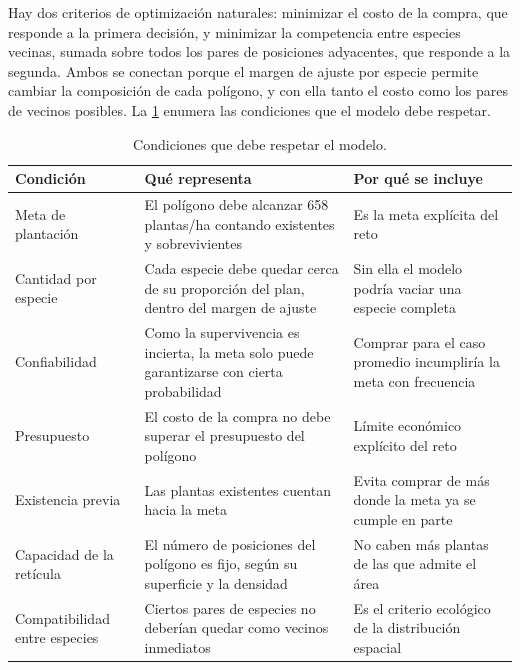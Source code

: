 Hay dos criterios de optimización naturales: minimizar el costo de la compra, que responde a la primera decisión, y minimizar la competencia entre especies vecinas, sumada sobre todos los pares de posiciones adyacentes, que responde a la segunda. Ambos se conectan porque el margen de ajuste por especie permite cambiar la composición de cada polígono, y con ella tanto el costo como los pares de vecinos posibles. La \cref{tab:requisitos} enumera las condiciones que el modelo debe respetar.

\begin{table}[t]
\centering
\caption{Condiciones que debe respetar el modelo.}
\label{tab:requisitos}
\small
\begin{tabularx}{\textwidth}{@{}>{\RaggedRight\arraybackslash}p{}>{\RaggedRight\arraybackslash}X>{\RaggedRight\arraybackslash}p{}@{}}
\toprule
Condición & Qué representa & Por qué se incluye \\
\midrule
Meta de plantación & El polígono debe alcanzar 658 plantas/ha contando existentes y sobrevivientes & Es la meta explícita del reto \\
Cantidad por especie & Cada especie debe quedar cerca de su proporción del plan, dentro del margen de ajuste & Sin ella el modelo podría vaciar una especie completa \\
Confiabilidad & Como la supervivencia es incierta, la meta solo puede garantizarse con cierta probabilidad & Comprar para el caso promedio incumpliría la meta con frecuencia \\
Presupuesto & El costo de la compra no debe superar el presupuesto del polígono & Límite económico explícito del reto \\
Existencia previa & Las plantas existentes cuentan hacia la meta & Evita comprar de más donde la meta ya se cumple en parte \\
Capacidad de la retícula & El número de posiciones del polígono es fijo, según su superficie y la densidad & No caben más plantas de las que admite el área \\
Compatibilidad entre especies & Ciertos pares de especies no deberían quedar como vecinos inmediatos & Es el criterio ecológico de la distribución espacial \\
\bottomrule
\end{tabularx}
\end{table}
